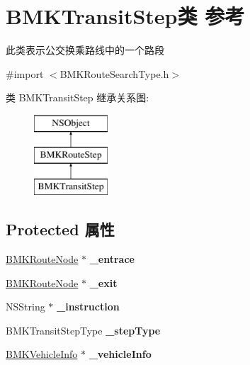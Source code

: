 \hypertarget{interface_b_m_k_transit_step}{}\section{B\+M\+K\+Transit\+Step类 参考}
\label{interface_b_m_k_transit_step}


此类表示公交换乘路线中的一个路段  




{\ttfamily \#import $<$B\+M\+K\+Route\+Search\+Type.\+h$>$}

类 B\+M\+K\+Transit\+Step 继承关系图\+:\begin{figure}[H]
\begin{center}
\leavevmode
\includegraphics[height=3.000000cm]{interface_b_m_k_transit_step}
\end{center}
\end{figure}
\subsection*{Protected 属性}
\begin{DoxyCompactItemize}
\item 
\hypertarget{interface_b_m_k_transit_step_a3f777185172c4fc2908bdf085608f667}{}\hyperlink{interface_b_m_k_route_node}{B\+M\+K\+Route\+Node} $\ast$ {\bfseries \+\_\+entrace}\label{interface_b_m_k_transit_step_a3f777185172c4fc2908bdf085608f667}

\item 
\hypertarget{interface_b_m_k_transit_step_a19b1312da2bc9127325d463d3ab24394}{}\hyperlink{interface_b_m_k_route_node}{B\+M\+K\+Route\+Node} $\ast$ {\bfseries \+\_\+exit}\label{interface_b_m_k_transit_step_a19b1312da2bc9127325d463d3ab24394}

\item 
\hypertarget{interface_b_m_k_transit_step_a1fc4eb0a80c0df8cdaca074cdd0e4dbf}{}N\+S\+String $\ast$ {\bfseries \+\_\+instruction}\label{interface_b_m_k_transit_step_a1fc4eb0a80c0df8cdaca074cdd0e4dbf}

\item 
\hypertarget{interface_b_m_k_transit_step_a5605e43564a15320633eca415340c07a}{}B\+M\+K\+Transit\+Step\+Type {\bfseries \+\_\+step\+Type}\label{interface_b_m_k_transit_step_a5605e43564a15320633eca415340c07a}

\item 
\hypertarget{interface_b_m_k_transit_step_abd02085fceae2720a221647f73ab0524}{}\hyperlink{interface_b_m_k_vehicle_info}{B\+M\+K\+Vehicle\+Info} $\ast$ {\bfseries \+\_\+vehicle\+Info}\label{interface_b_m_k_transit_step_abd02085fceae2720a221647f73ab0524}

\end{DoxyCompactItemize}
